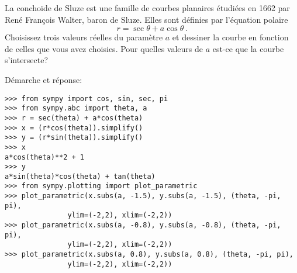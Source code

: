 \begin{question}[2 pts]
La conchoïde de Sluze est une famille de courbes planaires étudiées en 1662
par René François Walter, baron de Sluze. Elles sont définies par l'équation
polaire
\[
    {\displaystyle r=\sec \theta +a\cos \theta \,}. 
\]
Choisissez trois valeurs réelles du paramètre $a$ et dessiner la courbe en
fonction de celles que vous avez choisies. Pour quelles valeurs de $a$ est-ce
que la courbe s'intersecte?
\begin{mybox}
    Démarche et réponse:
\begin{reponse}
\begin{verbatim}
>>> from sympy import cos, sin, sec, pi
>>> from sympy.abc import theta, a
>>> r = sec(theta) + a*cos(theta)
>>> x = (r*cos(theta)).simplify()
>>> y = (r*sin(theta)).simplify()
>>> x
a*cos(theta)**2 + 1
>>> y
a*sin(theta)*cos(theta) + tan(theta)
>>> from sympy.plotting import plot_parametric
>>> plot_parametric(x.subs(a, -1.5), y.subs(a, -1.5), (theta, -pi, pi), 
               ylim=(-2,2), xlim=(-2,2))
>>> plot_parametric(x.subs(a, -0.8), y.subs(a, -0.8), (theta, -pi, pi), 
               ylim=(-2,2), xlim=(-2,2))
>>> plot_parametric(x.subs(a, 0.8), y.subs(a, 0.8), (theta, -pi, pi), 
               ylim=(-2,2), xlim=(-2,2))
\end{verbatim}
\end{reponse}
\end{mybox}
\end{question}


